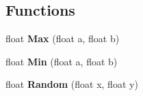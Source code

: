\subsection*{Functions}
\begin{DoxyCompactItemize}
\item 
\hypertarget{namespace_m_a_g_e_a1bed5a930aea388098142aa3ff874789}{float {\bfseries Max} (float a, float b)}\label{namespace_m_a_g_e_a1bed5a930aea388098142aa3ff874789}

\item 
\hypertarget{namespace_m_a_g_e_a2f1c180ea5a765fe2ab5b2c4778d466d}{float {\bfseries Min} (float a, float b)}\label{namespace_m_a_g_e_a2f1c180ea5a765fe2ab5b2c4778d466d}

\item 
\hypertarget{namespace_m_a_g_e_a6f1b1461b20a31ddc1ec34750b1f4004}{float {\bfseries Random} (float x, float y)}\label{namespace_m_a_g_e_a6f1b1461b20a31ddc1ec34750b1f4004}

\end{DoxyCompactItemize}
